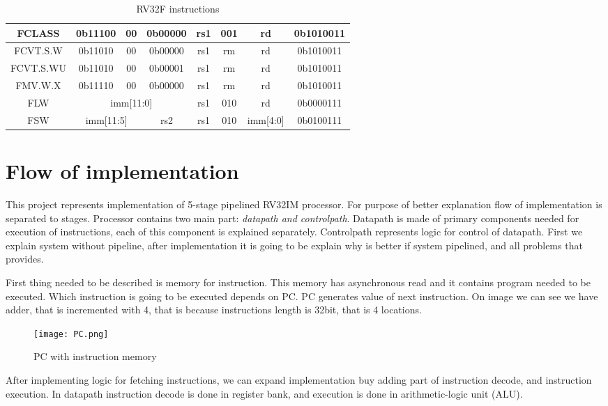 \documentclass{scrreprt}
\begin{document}
\begin{table}[htb!]
\begin{tabular}{|c|c|c|c|c|c|c|c|}
             FCLASS & 0b11100 & 00 & 0b00000 & rs1 & 001 & rd & 0b1010011\\ \hline 
             FCVT.S.W & 0b11010 & 00 & 0b00000 & rs1 & rm & rd & 0b1010011\\ \hline 
             FCVT.S.WU & 0b11010 & 00 & 0b00001 & rs1 & rm & rd & 0b1010011\\ \hline 
             FMV.W.X & 0b11110 & 00 & 0b00000 & rs1 & rm & rd & 0b1010011 \\ \hline 
             FLW & \multicolumn{3}{c|}{imm[11:0]} & rs1 & 010 & rd & 0b0000111\\ \hline 
             FSW & \multicolumn{2}{c|}{imm[11:5]} & rs2 & rs1 & 010 & imm[4:0] & 0b0100111 \\ \hline 
        \end{tabular}
        \caption{RV32F instructions}
        \label{tab:tableRV32F}
    \end{table}
\newpage
\section*{Flow of implementation}

This project represents implementation of 5-stage pipelined RV32IM processor. For purpose of better explanation flow of implementation is separated to stages. Processor contains two main part: \textit{datapath and controlpath}. Datapath is made of primary components needed for execution of instructions, each of this component is explained separately. Controlpath represents logic for control of datapath. First we explain system without pipeline, after implementation it is going to be explain why is better if system pipelined, and all problems that provides. 

First thing needed to be described is memory for instruction. This memory has asynchronous read and it contains program needed to be executed. Which instruction is going to be executed depends on PC. PC generates value of next instruction. On image we can see we have adder, that is incremented with 4, that is because instructions length is 32bit, that is 4 locations. 

\begin{figure}[ht]
    \centering
    \texttt{[image: PC.png]}
    \caption{PC with instruction memory}
    \label{fig:enter-label}
\end{figure}
\hfill \break

After implementing logic for fetching instructions, we can expand implementation buy adding part of instruction decode, and instruction execution. In datapath instruction decode is done in register bank, and execution is done in arithmetic-logic unit (ALU). 
\end{document}

